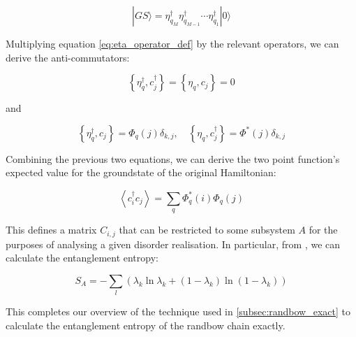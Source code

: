 \begin{equation}
|G S\rangle=\eta_{q_M}^{\dagger} \eta_{q_{M-1}}^{\dagger} \cdots \eta_{q_1}^{\dagger}|0\rangle
\end{equation}

Multiplying equation \ref{eq:eta_operator_def} by the relevant operators, we can derive the anti-commutators:

\begin{equation}
\left\{\eta_q^{\dagger}, c_j^{\dagger}\right\}=\left\{\eta_q, c_j\right\}=0
\end{equation}

and

\begin{equation}
\left\{\eta_q^{\dagger}, c_j\right\}=\Phi_q(j) \delta_{k, j}, \quad\left\{\eta_q, c_j^{\dagger}\right\}=\Phi^*(j) \delta_{k, j}
\end{equation}

Combining the previous two equations, we can derive the two point function's expected value for the groundstate of the original Hamiltonian:

\begin{equation}
\left\langle c_i^{\dagger} c_j\right\rangle=\sum_q \Phi_q^*(i) \Phi_q(j)
\end{equation}

This defines a matrix $C_{i, j}$ that can be restricted to some subsystem $A$ for the purposes of analysing a given disorder realisation. In particular, from \cite{peschelReducedDensityMatrices2009}, we can calculate the entanglement entropy:

\begin{equation}
S_A=-\sum_l\left(\lambda_k \ln \lambda_k+\left(1-\lambda_k\right) \ln \left(1-\lambda_k\right)\right)
\end{equation}

This completes our overview of the technique used in \ref{subsec:randbow_exact} to calculate the entanglement entropy of the randbow chain exactly.



